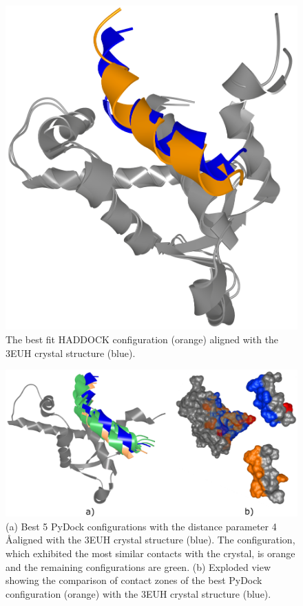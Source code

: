 \documentclass{bmcart}
\def\ExpView {Exploded view\xspace}
\begin{document}
\begin{backmatter}
\begin{figure}[h!]
  \centering
  \includegraphics[width=\columnwidth]{images/figure17.png}
  \caption{ The best fit HADDOCK configuration (orange) aligned with the 3EUH crystal structure (blue).}
  \label{fig:MukEF_selection_3_best_pair}
\end{figure}

\begin{figure}[h!]
    \centering 
    \includegraphics[width=\columnwidth]{images/figure18.pdf}
    \caption{(a) Best 5 PyDock configurations with the distance parameter 4 \AA aligned with the 3EUH crystal structure (blue). The configuration, which exhibited the most similar contacts with the crystal, is orange and the remaining configurations are green. (b) \ExpView showing the comparison of contact zones of the best PyDock configuration (orange) with the 3EUH crystal structure (blue).}
  \label{fig:pydock_pocket_string}
\end{figure}




\end{backmatter}
\end{document}
